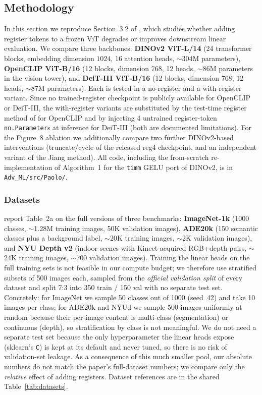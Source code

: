 \subsection{Methodology}
\label{sec:method-P}

In this section we reproduce Section~3.2 of \citet{darcet2024vision}, which studies whether adding register tokens to a frozen ViT degrades or improves downstream linear evaluation. We compare three backbones: \textbf{DINOv2 ViT-L/14} (24 transformer blocks, embedding dimension $1024$, 16 attention heads, $\sim 304$M parameters), \textbf{OpenCLIP ViT-B/16} (12 blocks, dimension $768$, 12 heads, $\sim 86$M parameters in the vision tower), and \textbf{DeiT-III ViT-B/16} (12 blocks, dimension $768$, 12 heads, $\sim 87$M parameters). Each is tested in a no-register and a with-register variant. Since no trained-register checkpoint is publicly available for OpenCLIP or DeiT-III, the with-register variants are substituted by the test-time register method of \citet{jiang2025vision} for OpenCLIP and by injecting 4 untrained register-token \texttt{nn.Parameter}s at inference for DeiT-III (both are documented limitations). For the Figure~8 ablation we additionally compare two further DINOv2-based interventions (truncate/cycle of the released reg4 checkpoint, and an independent variant of the Jiang method). All code, including the from-scratch re-implementation of \citet{jiang2025vision} Algorithm~1 for the \texttt{timm} GELU port of DINOv2, is in \texttt{Adv\_ML/src/Paolo/}.

\subsubsection{Datasets}
\citet{darcet2024vision} report Table~2a on the full versions of three benchmarks: \textbf{ImageNet-1k} (1000 classes, $\sim$1.28M training images, 50K validation images), \textbf{ADE20k} (150 semantic classes plus a background label, $\sim$20K training images, $\sim$2K validation images), and \textbf{NYU Depth v2} (indoor scenes with Kinect-acquired RGB+depth pairs, $\sim$24K training images, $\sim$700 validation images). Training the linear heads on the full training sets is not feasible in our compute budget; we therefore use stratified subsets of 500 images each, sampled from the \emph{official validation split} of every dataset and split 7:3 into 350 train / 150 val with no separate test set. Concretely: for ImageNet we sample 50 classes out of 1000 (seed~42) and take 10 images per class; for ADE20k and NYUd we sample 500 images uniformly at random because their per-image content is multi-class (segmentation) or continuous (depth), so stratification by class is not meaningful. We do not need a separate test set because the only hyperparameter the linear heads expose (sklearn's \texttt{C}) is kept at its default and never tuned, so there is no risk of validation-set leakage. As a consequence of this much smaller pool, our absolute numbers do not match the paper's full-dataset numbers; we compare only the \emph{relative} effect of adding registers. Dataset references are in the shared Table~\ref{tab:datasets}.

